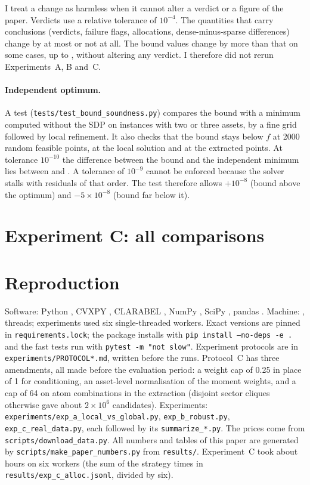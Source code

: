 \documentclass[11pt,a4paper]{article}
\begin{document}
I treat a change as harmless when it cannot alter a verdict or a figure of the paper.
Verdicts use a relative tolerance of $10^{-4}$.
The quantities that carry conclusions (verdicts, failure flags, allocations, dense-minus-sparse differences) change by at most \spConcl{} or not at all.
The bound values change by more than that on some cases, up to \spCCl{}, without altering any verdict.
I therefore did not rerun Experiments~A, B and~C.

\paragraph{Independent optimum.}
A test (\texttt{tests/test\_bound\_soundness.py}) compares the bound with a minimum computed without the SDP on \smN{} instances with two or three assets, by a fine grid followed by local refinement.
It also checks that the bound stays below $f$ at 2000 random feasible points, at the local solution and at the extracted points.
At tolerance $10^{-10}$ the difference between the bound and the independent minimum lies between \smMin{} and \smMax{}.
A tolerance of $10^{-9}$ cannot be enforced because the solver stalls with residuals of that order.
The test therefore allows $+10^{-8}$ (bound above the optimum) and $-5\times10^{-8}$ (bound far below it).

\section{Experiment C: all comparisons}\label{app:tests}


\section{Reproduction}\label{app:repro}
Software: Python \verPython{}, CVXPY \verCvxpy{}, CLARABEL \verClarabel{}, NumPy \verNumpy{}, SciPy \verScipy{}, pandas \verPandas{}.
Machine: \cpuModel{}, \cpuThreads{} threads; experiments used six single-threaded workers.
Exact versions are pinned in \texttt{requirements.lock}; the package installs with \texttt{pip install --no-deps -e .} and the fast tests run with \texttt{pytest -m "not slow"}.
Experiment protocols are in \texttt{experiments/PROTOCOL*.md}, written before the runs.
Protocol~C has three amendments, all made before the evaluation period: a weight cap of 0.25 in place of 1 for conditioning, an asset-level normalisation of the moment weights, and a cap of 64 on atom combinations in the extraction (disjoint sector cliques otherwise gave about $2\times10^6$ candidates).
Experiments: \texttt{experiments/exp\_a\_local\_vs\_global.py}, \texttt{exp\_b\_robust.py}, \texttt{exp\_c\_real\_data.py}, each followed by its \texttt{summarize\_*.py}.
The prices come from \texttt{scripts/download\_data.py}.
All numbers and tables of this paper are generated by \texttt{scripts/make\_paper\_numbers.py} from \texttt{results/}.
Experiment~C took about \cWallHours{} hours on six workers (the sum of the strategy times in \texttt{results/exp\_c\_alloc.jsonl}, divided by six).
\end{document}
